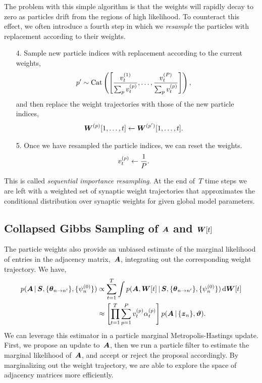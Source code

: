 The problem with this simple algorithm is that the weights will rapidly 
decay to zero as particles drift from the regions of high likelihood. 
To counteract this effect, we often introduce a fourth step in which we 
\emph{resample} the particles with replacement according to their weights. 
\begin{enumerate}
\item[4.] Sample new particle indices with replacement according to the current weights, 
  \begin{align*}
    p' &\sim \mathrm{Cat} \left(
         \left[ \frac{v_t^{(1)}}{\sum_{p} v_t^{(p)}}, \ldots,
         \frac{v_t^{(P)}}{\sum_{p} v_t^{(p)}} \right] \right),
  \end{align*}
  and then replace the weight trajectories with those of the new particle indices,
  \begin{align*}
    \boldsymbol{W}^{(p)}[1,\ldots,t] &\leftarrow \boldsymbol{W}^{(p')}[1,\ldots,t].
  \end{align*}

\item[5.]   Once we have resampled the particle indices, we can reset the weights.
  \begin{align*}
    v_t^{(p)} &\leftarrow \frac{1}{P}.
  \end{align*}
\end{enumerate}
This is called \emph{sequential importance resampling}. At the end of~$T$
time steps we are left with a weighted set of synaptic weight trajectories
that approximates the conditional distribution over synaptic weights 
for given global model parameters.

\subsection{Collapsed Gibbs Sampling of $\boldsymbol{A}$ and $\boldsymbol{W}[t]$}
The particle weights also provide an unbiased estimate of the marginal
likelihood of entries in the adjacency matrix,~$\boldsymbol{A}$, integrating out
the corresponding weight trajectory. We have,
\begin{align*}
p(\boldsymbol{A} \,|\, \boldsymbol{S}, \{\boldsymbol{\theta}_{n \to n'}\}, \{\psi_n^{(0)}\}) 
&\propto  \sum_{t=1}^{T} \int  p( \boldsymbol{A}, \boldsymbol{W}[t] \,|\, \boldsymbol{S}, \{\boldsymbol{\theta}_{n \to n'}\}, \{\psi_n^{(0)}\}) \, \mathrm{d}\boldsymbol{W}[t] \\
&\approx \left[\prod_{t=1}^T \sum_{p=1}^P v_t^{(p)} \alpha_t^{(p)} \right] p(\boldsymbol{A} \,|\, \{\boldsymbol{z}_n\}, \boldsymbol{\vartheta}).
\end{align*}
We can leverage this estimator in a particle marginal Metropolis-Hastings
\citep{Andrieu-2010} update. First, we propose an update to~$\boldsymbol{A}$, then
we run a particle filter to estimate the marginal likelihood of~$\boldsymbol{A}$, 
and accept or reject the proposal accordingly.
By marginalizing out the weight trajectory, we
are able to explore the space of adjacency matrices more efficiently.

